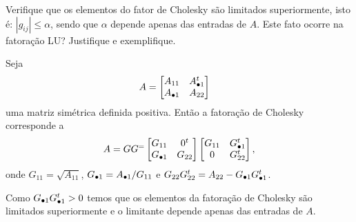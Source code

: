 \begin{questions}
    \question Verifique que os elementos do fator de Cholesky s\~{a}o limitados superiormente, isto \'{e}: $| g_{ij} | \leq \alpha$, sendo que $\alpha$ depende apenas das entradas de $A$. Este fato ocorre na fatora\c{c}\~{a}o LU? Justifique e exemplifique.
    \begin{solution}
        Seja
        \begin{align*}
            A &= \begin{bmatrix}
                A_{11} & A_{\bullet 1}^t \\
                A_{\bullet 1} & A_{22}
            \end{bmatrix}
        \end{align*}
        uma matriz sim\'{e}trica definida positiva. Ent\~{a}o a fatora\c{c}\~{a}o de Cholesky corresponde a
        \begin{align*}
            A = G G^ = \begin{bmatrix}
                G_{11} & 0^t \\
                G_{\bullet 1} & G_{22}
            \end{bmatrix} \begin{bmatrix}
                G_{11} & G_{\bullet 1}^t \\
                0 & G_{22}^t
            \end{bmatrix},
        \end{align*}
        onde $G_{11} = \sqrt{A_{11}}$, $G_{\bullet 1} = A_{\bullet 1} / G_{11}$ e $G_{22} G_{22}^t = A_{22} - G_{\bullet 1} G_{\bullet 1}^t$.

        Como $G_{\bullet 1} G_{\bullet 1}^t > 0$ temos que os elementos da fatora\c{c}\~{a}o de Cholesky s\~{a}o limitados superiormente e o limitante depende apenas das entradas de $A$.
    \end{solution}


\end{questions}
